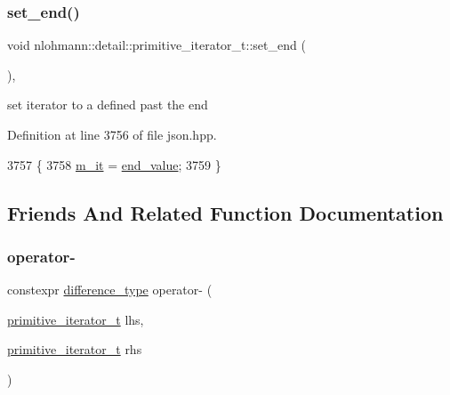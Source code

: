 \subsubsection{\texorpdfstring{set\+\_\+end()}{set\_end()}}
{\footnotesize\ttfamily void nlohmann\+::detail\+::primitive\+\_\+iterator\+\_\+t\+::set\+\_\+end (\begin{DoxyParamCaption}{ }\end{DoxyParamCaption})\hspace{0.3cm}{\ttfamily [inline]}, {\ttfamily [noexcept]}}



set iterator to a defined past the end 



Definition at line 3756 of file json.\+hpp.


\begin{DoxyCode}
3757     \{
3758         \hyperlink{classnlohmann_1_1detail_1_1primitive__iterator__t_a4357355113b0cd7e12b15c2e93703510}{m\_it} = \hyperlink{classnlohmann_1_1detail_1_1primitive__iterator__t_aa37c37da44f19e6ec1d7d4a9910511c7}{end\_value};
3759     \}
\end{DoxyCode}


\subsection{Friends And Related Function Documentation}
\mbox{\label{classnlohmann_1_1detail_1_1primitive__iterator__t_ac6d902d6ec9a02dabed5452d3ae78f7e}} 
\subsubsection{\texorpdfstring{operator-\/}{operator-}}
{\footnotesize\ttfamily constexpr \hyperlink{classnlohmann_1_1detail_1_1primitive__iterator__t_af3db0d5c90de427d51645fe73a015553}{difference\+\_\+type} operator-\/ (\begin{DoxyParamCaption}\item[{\hyperlink{classnlohmann_1_1detail_1_1primitive__iterator__t}{primitive\+\_\+iterator\+\_\+t}}]{lhs,  }\item[{\hyperlink{classnlohmann_1_1detail_1_1primitive__iterator__t}{primitive\+\_\+iterator\+\_\+t}}]{rhs }\end{DoxyParamCaption})\hspace{0.3cm}{\ttfamily [friend]}}



